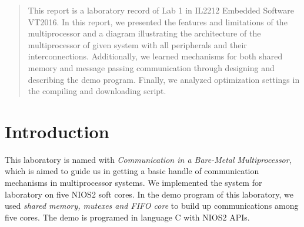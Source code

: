 \documentclass[conference]{IEEEtran}
\begin{document}




\maketitle

\begin{abstract}
This report is a laboratory record of Lab 1 in IL2212 Embedded Software VT2016. In this report, we presented the features and limitations of the multiprocessor and a diagram illustrating the architecture of the multiprocessor of given system with all peripherals and their interconnections. Additionally, we learned mechanisms for both shared memory and message passing communication through designing and describing the demo program. Finally, we analyzed optimization settings in the compiling and downloading script. 
\end{abstract}





%
\IEEEpeerreviewmaketitle



\section{Introduction}
This laboratory is named with \emph{Communication in a Bare-Metal Multiprocessor}, which is aimed to guide us in getting a basic handle of communication mechanisms in multiprocessor systems. We implemented the system for laboratory on five NIOS2 soft cores. In the demo program of this laboratory, we used \emph{shared memory, mutexes and FIFO core} to build up communications among five cores. The demo is programed in language C with NIOS2 APIs.
\end{document}
